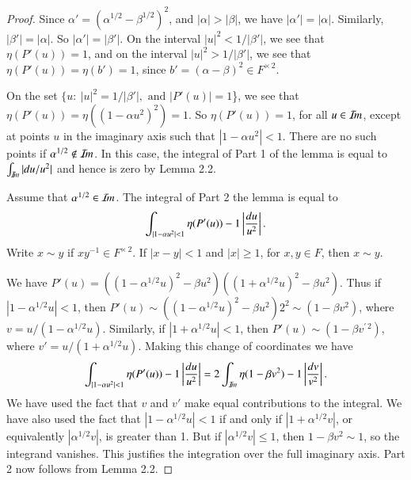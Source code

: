 \documentclass{amsart}
\newcommand\leftd[1]{\left | {d#1\over #1^2}\right |}
\newcommand\leftdu{\leftd u}
\newcommand\Imm{{\mathcal I\hskip-.2em m}}
\begin{document}
\bigskip
\noindent
\begin{proof} Since $\alpha'=(\alpha^{1/2}-\beta^{1/2})^2$, and $|\alpha|>|\beta|$,
we have $|\alpha'| = |\alpha|$.  Similarly, $|\beta'| =|\alpha|$.  So
$|\alpha'|=|\beta'|$.  On the interval $|u|^2 < 1/|\beta'|$,
we see that $\eta(P'(u)) = 1$, and on the interval $|u|^2 > 1/|\beta'|$,
we see that $\eta(P'(u)) = \eta(b') = 1$, since $b'=(\alpha-\beta)^2\in
F^{\times\, 2}$.

On the set $\{u:\ |u|^2 = 1/|\beta'|,\text{ and }|P'(u)|=1$\},
we see that $\eta(P'(u)) = \eta((1-\alpha u^2)^2) = 1$.
So $\eta(P'(u)) = 1$, for all $u\in \Imm$, except at points $u$
in the imaginary axis such that $|1-\alpha u^2|<1$.  There are
no such points if $\alpha^{1/2}\not\in\Imm$.  
In this case, the integral of Part 1 of the lemma is 
equal to $\int_{\Imm} |du/u^2|$ and hence is zero by Lemma 2.2.

Assume that $\alpha^{1/2}\in \Imm$.  The integral of Part 2
the lemma is equal to 
$$\int _{|1-\alpha u^2|<1} \eta(P'(u)) -1 \leftdu.$$
Write $x \sim y$ if $xy^{-1}\in F^{\times\,2}$.
If $|x-y|<1$ and $|x|\ge 1$, for $x,y\in F$, 
then $x\sim y$.

We have
$P'(u) = ((1- \alpha^{1/2} u)^2-\beta u^2)
((1+\alpha^{1/2} u)^2-\beta u^2)$.  Thus
if $|1-\alpha^{1/2} u|<1$,
then $P'(u) \sim ((1-\alpha^{1/2}u)^2-\beta u^2)2^2
\sim (1-\beta v^2)$, where $v = u/(1-\alpha^{1/2}u)$.  Similarly, if
$|1+\alpha^{1/2} u|<1$,
then $P'(u)\sim (1-\beta v^{\prime\,2})$,
where $v' = u/(1+\alpha^{1/2} u)$.
Making this change of coordinates we have
$$\int_{|1-\alpha u^2|<1} \eta(P'(u))-1 \leftdu = 2
\int_{\Imm} \eta(1-\beta v^2)-1 \leftd v.$$
We have used the fact that $v$ and $v'$ make equal contributions to the
integral.  We have also used the fact that $|1-\alpha^{1/2} u | <1$
if and only if $|1+\alpha^{1/2} v  |$, or equivalently $|\alpha^{1/2}v|$,
is greater than 1.  But if $|\alpha^{1/2} v|\le 1$, then $1-\beta v^2\sim 1$,
so the integrand vanishes.  This justifies the integration over the
full imaginary axis.  Part 2 now follows from Lemma 2.2.


\end{proof}
\end{document}

